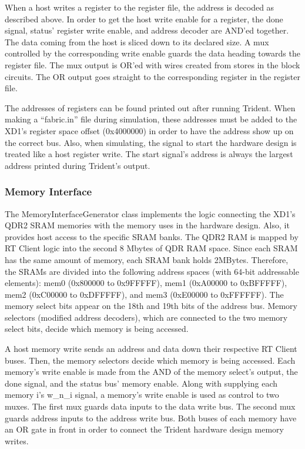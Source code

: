 When a host writes a register to the register file, the address is
decoded as described above.  In order to get the host write enable for
a register, the done signal, status' register write enable, and
address decoder are AND'ed together.  The data coming from the host is
sliced down to its declared size.  A mux controlled by the
corresponding write enable guards the data heading towards the
register file.  The mux output is OR'ed with wires created from stores
in the block circuits.  The OR output goes straight to the
corresponding register in the register file.

The addresses of registers can be found printed out after running
Trident.  When making a ``fabric.in'' file during simulation, these
addresses must be added to the XD1's register space offset (0x4000000)
in order to have the address show up on the correct bus.  Also, when
simulating, the signal to start the hardware design is treated like a
host register write.  The start signal's address is always the largest
address printed during Trident's output.

\subsubsection{Memory Interface}
The MemoryInterfaceGenerator class implements the logic connecting the
XD1's QDR2 SRAM memories with the memory uses in the hardware design.
Also, it provides host access to the specific SRAM banks.  The QDR2
RAM is mapped by RT Client logic into the second 8 Mbytes of QDR RAM
space.  Since each SRAM has the same amount of memory, each SRAM bank
holds 2MBytes.  Therefore, the SRAMs are divided into the following
address spaces (with 64-bit addressable elements): mem0 (0x800000 to
0x9FFFFF), mem1 (0xA00000 to 0xBFFFFF), mem2 (0xC00000 to 0xDFFFFF),
and mem3 (0xE00000 to 0xFFFFFF).  The memory select bits appear on the
18th and 19th bits of the address bus.  Memory selectors (modified
address decoders), which are connected to the two memory select bits,
decide which memory is being accessed.

A host memory write sends an address and data down their respective RT
Client buses.  Then, the memory selectors decide which memory is being
accessed.  Each memory's write enable is made from the AND of the
memory select's output, the done signal, and the status bus' memory
enable.  Along with supplying each memory i's w\_n\_i signal, a
memory's write enable is used as control to two muxes. The first mux
guards data inputs to the data write bus.  The second mux guards
address inputs to the address write bus.  Both buses of each memory
have an OR gate in front in order to connect the Trident hardware
design memory writes.

